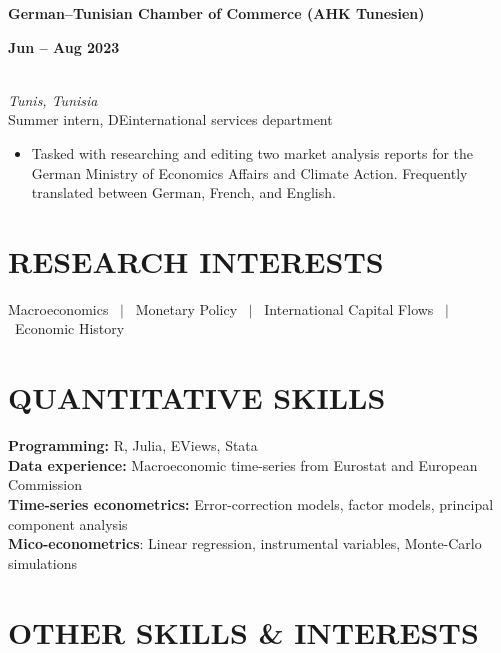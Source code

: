 \documentclass[a4paper,9pt]{extarticle}
\begin{document}
\noindent
\begin{minipage}[t]{0.7\textwidth}
  \textbf{German--Tunisian Chamber of Commerce (AHK Tunesien)}
\end{minipage}
\begin{minipage}[t]{0.3\textwidth}
  \raggedleft \textbf{Jun -- Aug 2023}
\end{minipage}
\\
\textit{Tunis, Tunisia} \\ 
Summer intern, DEinternational services department 
\begin{itemize}[noitemsep, topsep=0pt, left=0.65cm]
    \item Tasked with researching and editing two market analysis reports for the German Ministry of Economics Affairs and Climate Action. Frequently translated between German, French, and English. 
\end{itemize} 


\section*{RESEARCH INTERESTS}

Macroeconomics \ $|$ \ Monetary Policy \ $|$ \ International Capital Flows \ $|$ \ Economic History 


\section*{QUANTITATIVE SKILLS}

\noindent
\textbf{Programming:} R, Julia, EViews, Stata \\
\textbf{Data experience:} Macroeconomic time-series from Eurostat and European Commission \\
\textbf{Time-series econometrics:} Error-correction models, factor models, principal component analysis \\
\textbf{Mico-econometrics}: Linear regression, instrumental variables, Monte-Carlo simulations


\section*{OTHER SKILLS \& INTERESTS}
\end{document}
